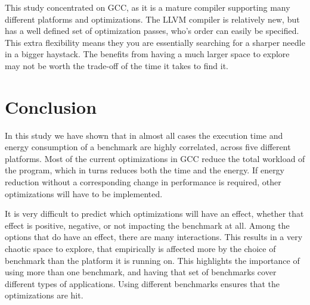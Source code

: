 \documentclass[twocolumn]{article}
\newcommand{\nsection}[1]{\section{\bfseries #1}}
\newcommand{\todo}[1]{\textbf{\textcolor{red}{#1}}}
\begin{document}
This study concentrated on GCC, as it is a mature compiler supporting many different platforms and optimizations. The LLVM compiler is relatively new, but has a well defined set of optimization passes, who's order can easily be specified. This extra flexibility means they you are essentially searching for a sharper needle in a bigger haystack. The benefits from having a much larger space to explore may not be worth the trade-off of the time it takes to find it.


\nsection{Conclusion}


In this study we have shown that in almost all cases the execution time and energy consumption of a benchmark are highly correlated, across five different platforms. Most of the current optimizations in GCC reduce the total workload of the program, which in turns reduces both the time and the energy. If energy reduction without a corresponding change in performance is required, other optimizations will have to be implemented.

It is very difficult to predict which optimizations will have an effect, whether that effect is positive, negative, or not impacting the benchmark at all. Among the options that do have an effect, there are many interactions. This results in a very chaotic space to explore, that empirically is affected more by the choice of benchmark than the platform it is running on. This highlights the importance of using more than one benchmark, and having that set of benchmarks cover different types of applications. Using different benchmarks ensures that the optimizations are hit.
\end{document}
